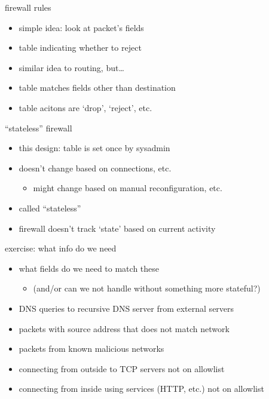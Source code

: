 \begin{frame}{firewall rules}
    \begin{itemize}
    \item simple idea: look at packet's fields
    \item table indicating whether to reject
    \vspace{.5cm}
    \item similar idea to routing, but\ldots
    \item table matches fields other than destination
    \item table acitons are `drop', `reject', etc.
    \end{itemize}
\end{frame}


\begin{frame}{``stateless'' firewall}
    \begin{itemize}
    \item this design: table is set once by sysadmin
    \item doesn't change based on connections, etc.
        \begin{itemize}
        \item might change based on manual reconfiguration, etc.
        \end{itemize}
    \vspace{.5cm}
    \item called ``stateless''
    \vspace{.5cm}
    \item firewall doesn't track `state' based on current activity
    \end{itemize}
\end{frame}

\begin{frame}{exercise: what info do we need}
    \begin{itemize}
    \item what fields do we need to match these
        \begin{itemize}
        \item (and/or can we not handle without something more stateful?)
        \end{itemize}
    \vspace{.5cm}
    \item DNS queries to recursive DNS server from external servers
    \item packets with source address that does not match network
    \item packets from known malicious networks
    \item connecting from outside  to TCP servers not on allowlist
    \item connecting from inside using services (HTTP, etc.) not on allowlist
    \end{itemize}
\end{frame}
